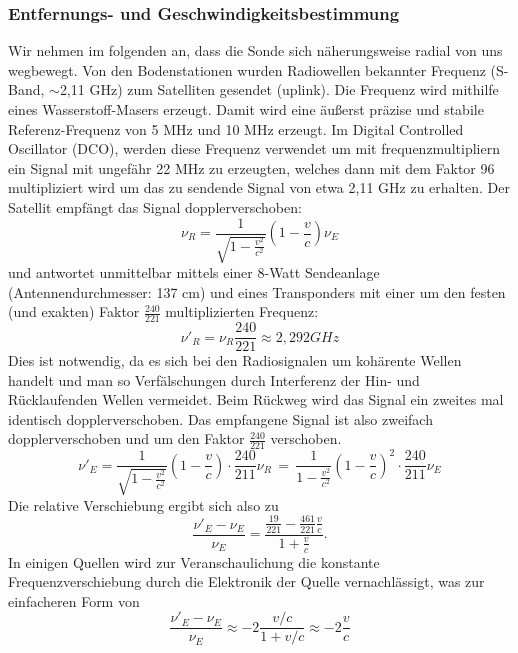 \subsubsection{Entfernungs- und Geschwindigkeitsbestimmung }
Wir nehmen im folgenden an, dass die Sonde sich näherungsweise radial von uns wegbewegt.
Von den Bodenstationen wurden Radiowellen bekannter Frequenz (S-Band, $\sim$2,11 GHz) zum Satelliten gesendet (uplink).
Die Frequenz wird mithilfe eines Wasserstoff-Masers erzeugt.
Damit wird eine äußerst präzise und stabile Referenz-Frequenz von 5 MHz und 10 MHz erzeugt. Im Digital Controlled Oscillator (DCO), werden diese Frequenz verwendet um mit frequenzmultipliern ein Signal mit ungefähr 22 MHz zu erzeugten, welches dann mit dem Faktor 96 multipliziert wird um das zu sendende Signal von etwa 2,11 GHz zu erhalten.\cite{Anderson2002}
Der Satellit empfängt das Signal dopplerverschoben:
\begin{equation}
 \nu_R = \frac{1}{\sqrt{1-\frac{v^2}{c^2}}}(1-\frac{v}{c})\nu_E
\end{equation}
und antwortet unmittelbar mittels einer 8-Watt Sendeanlage (Antennendurchmesser: 137 cm\cite{Markwardt2002}) und eines Transponders
mit einer um den festen (und exakten) Faktor $ \frac{240}{221} $ multiplizierten Frequenz:
\begin{equation}
\label{equ:Faktor}
\nu'_R = \nu_R\frac{240}{221} \approx 2,292 GHz
\end{equation}
Dies ist notwendig, da es sich bei den Radiosignalen um kohärente Wellen handelt und man so Verfälschungen durch Interferenz der Hin- und Rücklaufenden Wellen vermeidet.\cite{Anderson2002}
Beim Rückweg wird das Signal ein zweites mal identisch dopplerverschoben.
Das empfangene Signal ist also zweifach dopplerverschoben und um den Faktor $\frac{240}{221}$ verschoben.
\begin{equation}
 \nu'_E = \frac{1}{\sqrt{1-\frac{v^2}{c^2}}}(1-\frac{v}{c}) \cdot \frac{240}{211}\nu_R \, = \,
\frac{1}{1-\frac{v^2}{c^2}}(1-\frac{v}{c})^2 \cdot \frac{240}{211} \nu_E
\end{equation}
Die relative Verschiebung ergibt sich also zu
\begin{equation}
 \frac{\nu'_E-\nu_E}{\nu_E} = \frac{\frac{19}{221}- \frac{461}{221}\frac{v}{c}}{1+\frac{v}{c}}.
\end{equation}
In einigen Quellen wird zur Veranschaulichung die konstante Frequenzverschiebung durch die Elektronik der Quelle vernachlässigt, was zur
einfacheren Form von
\begin{equation}
 \frac{\nu'_E-\nu_E}{\nu_E} \approx -2\frac{v/c}{1+v/c} \approx -2 \frac{v}{c}
\end{equation}
